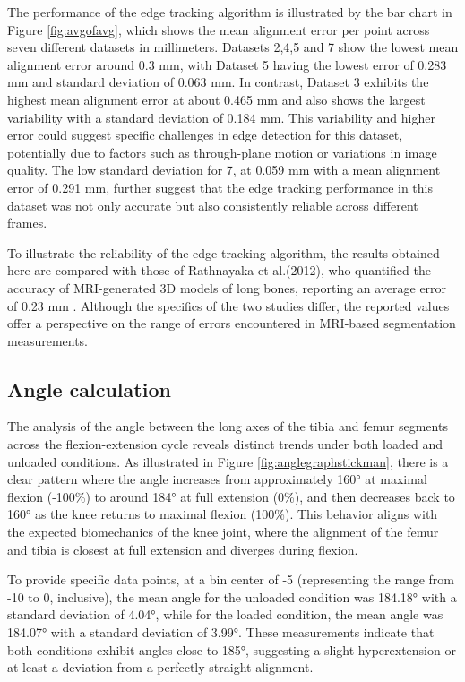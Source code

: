\documentclass{micro-econ-thesis}
\begin{document}
The performance of the edge tracking algorithm is illustrated by the bar chart in Figure \ref{fig:avgofavg}, which shows the mean alignment error per point across seven different datasets in millimeters. Datasets 2,4,5 and 7 show the lowest mean alignment error around 0.3 mm, with Dataset 5 having the lowest error of 0.283 mm and standard deviation of 0.063 mm. In contrast, Dataset 3 exhibits the highest mean alignment error at about 0.465 mm and also shows the largest variability with a standard deviation of 0.184 mm. This variability and higher error could suggest specific challenges in edge detection for this dataset, potentially due to factors such as through-plane motion or variations in image quality. The low standard deviation for 7, at 0.059 mm with a mean alignment error of 0.291 mm, further suggest that the edge tracking performance in this dataset was not only accurate but also consistently reliable across different frames.

To illustrate the reliability of the edge tracking algorithm, the results obtained here are compared with those of Rathnayaka et al.(2012), who quantified the accuracy of MRI-generated 3D models of long bones, reporting an average error of 0.23 mm \parencite{rathnayaka_quantification_2012}. Although the specifics of the two studies differ, the reported values offer a perspective on the range of errors encountered in MRI-based segmentation measurements. 

\subsection{Angle calculation}
The analysis of the angle between the long axes of the tibia and femur segments across the flexion-extension cycle reveals distinct trends under both loaded and unloaded conditions. As illustrated in Figure \ref{fig:anglegraphstickman}, there is a clear pattern where the angle increases from approximately 160° at maximal flexion (-100\%) to around 184° at full extension (0\%), and then decreases back to 160° as the knee returns to maximal flexion (100\%). This behavior aligns with the expected biomechanics of the knee joint, where the alignment of the femur and tibia is closest at full extension and diverges during flexion.

To provide specific data points, at a bin center of -5 (representing the range from -10 to 0, inclusive), the mean angle for the unloaded condition was 184.18° with a standard deviation of 4.04°, while for the loaded condition, the mean angle was 184.07° with a standard deviation of 3.99°. These measurements indicate that both conditions exhibit angles close to 185°, suggesting a slight hyperextension or at least a deviation from a perfectly straight alignment.
\end{document}
